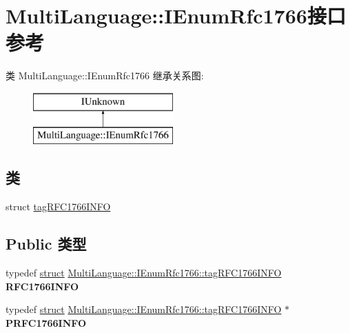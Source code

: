\hypertarget{interface_multi_language_1_1_i_enum_rfc1766}{}\section{Multi\+Language\+:\+:I\+Enum\+Rfc1766接口 参考}
\label{interface_multi_language_1_1_i_enum_rfc1766}
类 Multi\+Language\+:\+:I\+Enum\+Rfc1766 继承关系图\+:\begin{figure}[H]
\begin{center}
\leavevmode
\includegraphics[height=2.000000cm]{interface_multi_language_1_1_i_enum_rfc1766}
\end{center}
\end{figure}
\subsection*{类}
\begin{DoxyCompactItemize}
\item 
struct \hyperlink{struct_multi_language_1_1_i_enum_rfc1766_1_1tag_r_f_c1766_i_n_f_o}{tag\+R\+F\+C1766\+I\+N\+FO}
\end{DoxyCompactItemize}
\subsection*{Public 类型}
\begin{DoxyCompactItemize}
\item 
\mbox{\label{interface_multi_language_1_1_i_enum_rfc1766_a9063f99b0e4dce785a61e865f047b7d1}} 
typedef \hyperlink{interfacestruct}{struct} \hyperlink{struct_multi_language_1_1_i_enum_rfc1766_1_1tag_r_f_c1766_i_n_f_o}{Multi\+Language\+::\+I\+Enum\+Rfc1766\+::tag\+R\+F\+C1766\+I\+N\+FO} {\bfseries R\+F\+C1766\+I\+N\+FO}
\item 
\mbox{\label{interface_multi_language_1_1_i_enum_rfc1766_ab783d4224e3290ceb78d60bf94f57b27}} 
typedef \hyperlink{interfacestruct}{struct} \hyperlink{struct_multi_language_1_1_i_enum_rfc1766_1_1tag_r_f_c1766_i_n_f_o}{Multi\+Language\+::\+I\+Enum\+Rfc1766\+::tag\+R\+F\+C1766\+I\+N\+FO} $\ast$ {\bfseries P\+R\+F\+C1766\+I\+N\+FO}
\end{DoxyCompactItemize}
